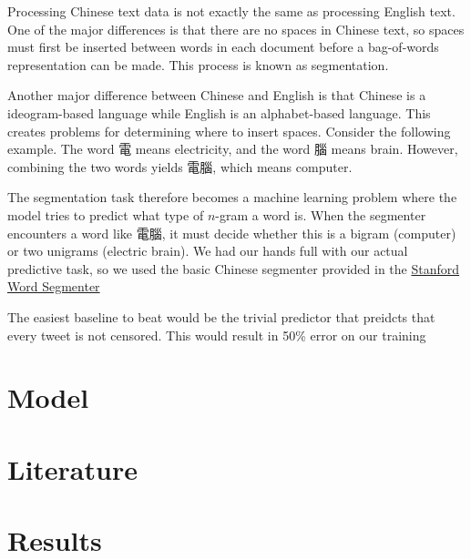 \documentclass{sig-alternate-05-2015}
\begin{document}
Processing Chinese text data is not exactly the same as processing English text. One of the major differences is that there are no spaces in Chinese text, so spaces must first be inserted between words in each document before a bag-of-words representation can be made. This process is known as segmentation. 

Another major difference between Chinese and English is that Chinese is a ideogram-based language while English is an alphabet-based language. This creates problems for determining where to insert spaces. Consider the following example. The word 電 means electricity, and the word 腦 means brain. However, combining the two words yields 電腦, which means computer.

The segmentation task therefore becomes a machine learning problem where the model tries to predict what type of $n$-gram a word is. When the segmenter encounters a word like 電腦, it must decide whether this is a bigram (computer) or two unigrams (electric brain). We had our hands full with our actual predictive task, so we used the basic Chinese segmenter provided in the \href{http://nlp.stanford.edu/software/segmenter.shtml}{Stanford Word Segmenter} \cite{Chang2008}

The easiest baseline to beat would be the trivial predictor that preidcts that every tweet is not censored. This would result in 50\% error on our training

\section{Model}

\section{Literature}

\section{Results}



\end{document}
